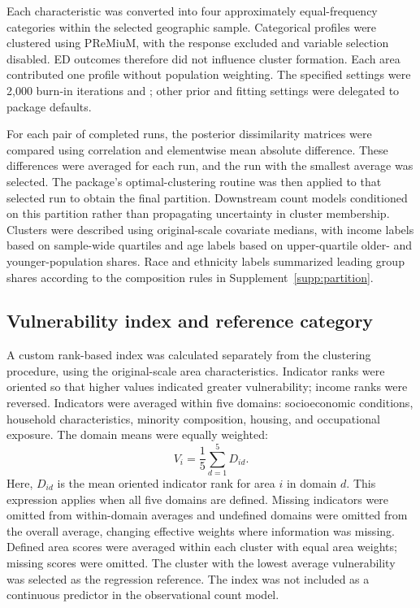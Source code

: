 \documentclass[11pt,letterpaper]{article}
\newcommand{\code}[1]{\texttt{\detokenize{#1}}}
\begin{document}
Each characteristic was converted into four approximately equal-frequency categories within the selected geographic sample. Categorical profiles were clustered using PReMiuM, with the response excluded and variable selection disabled. ED outcomes therefore did not influence cluster formation. Each area contributed one profile without population weighting. The specified settings were 2,000 burn-in iterations and \code{nSweeps = 10000}; other prior and fitting settings were delegated to package defaults.

For each pair of completed runs, the posterior dissimilarity matrices were compared using correlation and elementwise mean absolute difference. These differences were averaged for each run, and the run with the smallest average was selected. The package's optimal-clustering routine was then applied to that selected run to obtain the final partition. Downstream count models conditioned on this partition rather than propagating uncertainty in cluster membership. Clusters were described using original-scale covariate medians, with income labels based on sample-wide quartiles and age labels based on upper-quartile older- and younger-population shares. Race and ethnicity labels summarized leading group shares according to the composition rules in Supplement~\ref{supp:partition}.

\subsection{Vulnerability index and reference category}
A custom rank-based index was calculated separately from the clustering procedure, using the original-scale area characteristics. Indicator ranks were oriented so that higher values indicated greater vulnerability; income ranks were reversed. Indicators were averaged within five domains: socioeconomic conditions, household characteristics, minority composition, housing, and occupational exposure. The domain means were equally weighted:
\begin{equation}
V_i=\frac{1}{5}\sum_{d=1}^{5}D_{id}.
\label{eq:methods-index}
\end{equation}
Here, \(D_{id}\) is the mean oriented indicator rank for area \(i\) in domain \(d\). This expression applies when all five domains are defined. Missing indicators were omitted from within-domain averages and undefined domains were omitted from the overall average, changing effective weights where information was missing. Defined area scores were averaged within each cluster with equal area weights; missing scores were omitted. The cluster with the lowest average vulnerability was selected as the regression reference. The index was not included as a continuous predictor in the observational count model.
\end{document}

